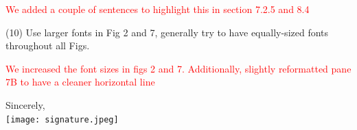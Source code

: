 \documentclass[11pt,a4paper]{letter} %
\begin{document}
\begin{letter}
\textcolor{red}{We added a couple of sentences to highlight this in section 7.2.5 and 8.4}

(10) Use larger fonts in Fig 2 and 7, generally try to have equally-sized fonts throughout all Figs.

\textcolor{red}{We increased the font sizes in figs 2 and 7. Additionally, slightly reformatted pane 7B to have a cleaner horizontal line}



\closing{Sincerely,\\[2mm]
 \hspace*{-1cm}\texttt{[image: signature.jpeg]}\\ \vspace*{-1.2cm}
}


\end{letter}
\end{document}

